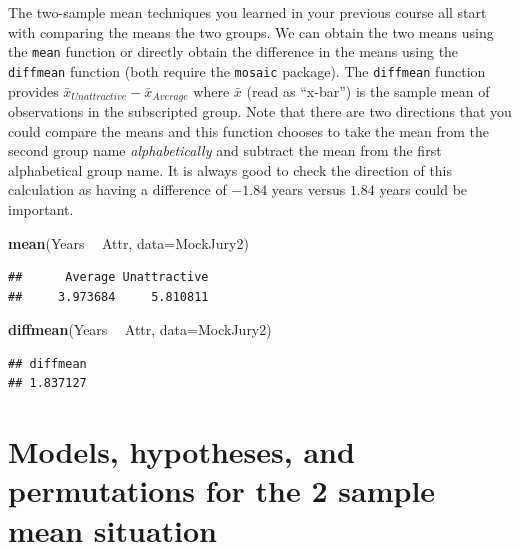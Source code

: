 \documentclass[]{book}
\newenvironment{Shaded}{\begin{snugshade}}{\end{snugshade}}
\newcommand{\KeywordTok}[1]{\textcolor[rgb]{0.13,0.29,0.53}{\textbf{#1}}}
\newcommand{\DataTypeTok}[1]{\textcolor[rgb]{0.13,0.29,0.53}{#1}}
\newcommand{\StringTok}[1]{\textcolor[rgb]{0.31,0.60,0.02}{#1}}
\newcommand{\OperatorTok}[1]{\textcolor[rgb]{0.81,0.36,0.00}{\textbf{#1}}}
\newcommand{\NormalTok}[1]{#1}
\begin{document}
The two-sample mean techniques you learned in your previous course all
start with comparing the means the two groups. We can obtain the two
means using the \texttt{mean} function or directly obtain the difference
in the means using the \texttt{diffmean} function (both require the
\texttt{mosaic} package). The \texttt{diffmean} function provides
\(\bar{x}_{Unattractive} - \bar{x}_{Average}\) where \(\bar{x}\) (read
as ``x-bar'') is the sample mean of observations in the subscripted
group. Note that there are two directions that you could compare the
means and this function chooses to take the mean from the second group
name \emph{alphabetically} and subtract the mean from the first
alphabetical group name. It is always good to check the direction of
this calculation as having a difference of \(-1.84\) years versus
\(1.84\) years could be important.

\begin{Shaded}
\begin{Highlighting}[]
\KeywordTok{mean}\NormalTok{(Years }\OperatorTok{~}\StringTok{ }\NormalTok{Attr, }\DataTypeTok{data=}\NormalTok{MockJury2)}
\end{Highlighting}
\end{Shaded}

\begin{verbatim}
##      Average Unattractive 
##     3.973684     5.810811
\end{verbatim}

\begin{Shaded}
\begin{Highlighting}[]
\KeywordTok{diffmean}\NormalTok{(Years }\OperatorTok{~}\StringTok{ }\NormalTok{Attr, }\DataTypeTok{data=}\NormalTok{MockJury2)}
\end{Highlighting}
\end{Shaded}

\begin{verbatim}
## diffmean 
## 1.837127
\end{verbatim}

\section{Models, hypotheses, and permutations for the 2 sample mean
situation}\label{section2-3}
\end{document}
